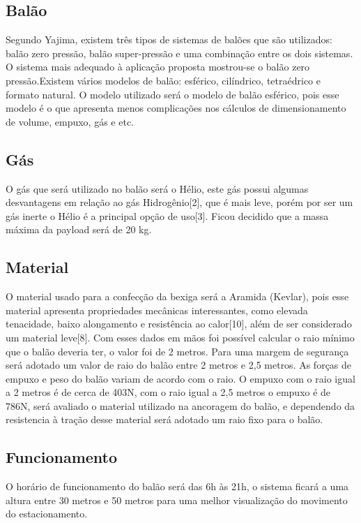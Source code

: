 \subsection{Balão}
    Segundo Yajima, existem três tipos de sistemas de balões que são utilizados: balão zero pressão, balão super-pressão e uma combinação entre os dois sistemas. O sistema mais adequado à aplicação proposta mostrou-se o balão zero pressão.Existem vários modelos de balão: esférico, cilíndrico, tetraédrico e formato natural. O modelo utilizado será o modelo de balão esférico, pois esse modelo é o que apresenta menos complicações nos cálculos de dimensionamento de volume, empuxo, gás e etc.

\subsection{Gás}
    O gás que será utilizado no balão será o Hélio, este gás possui algumas desvantagens em relação ao gás Hidrogênio[2], que é mais leve, porém por ser um gás inerte o Hélio é a principal opção  de uso[3]. Ficou decidido que a massa  máxima  da payload será de 20 kg.

 \subsection{Material}
    O material usado para a confecção da bexiga será a Aramida (Kevlar), pois  esse material apresenta propriedades mecânicas interessantes, como elevada tenacidade, baixo alongamento e resistência ao calor[10],  além de ser considerado um material leve[8]. Com esses dados em mãos foi possível calcular o raio mínimo que o balão deveria ter, o valor foi de 2 metros. Para uma margem de segurança será adotado um valor de raio do balão entre 2 metros e 2,5 metros. As forças de empuxo e peso do balão variam de acordo com o raio. O empuxo com o raio igual a 2 metros é de cerca de 403N, com o raio igual a 2,5 metros o empuxo é de 786N, será avaliado o material utilizado na ancoragem do balão,  e dependendo da resistencia à tração desse material será adotado um raio fixo para o balão.

\subsection{Funcionamento}
    O horário de funcionamento do balão será das 6h às 21h, o sistema ficará a uma altura entre 30 metros e 50 metros para uma melhor visualização do movimento do estacionamento.

